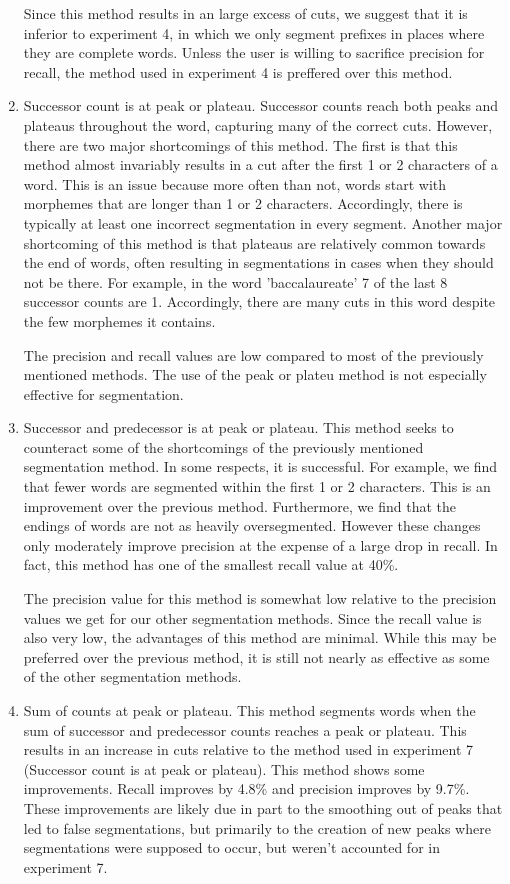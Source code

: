 \documentclass[11pt,letterpaper]{article}
\begin{document}
\begin{enumerate}
Since this method results in an large excess of cuts, we suggest that it is inferior to experiment 4, in which we only segment prefixes in places where they are complete words. Unless the user is willing to sacrifice precision for recall, the method used in experiment 4 is preffered over this method. 

\item Successor count is at peak or plateau. Successor counts reach both peaks and plateaus throughout the word, capturing many of the correct cuts. However, there are two major shortcomings of this method. The first is that this method almost invariably results in a cut after the first 1 or 2 characters of a word. This is an issue because more often than not, words start with morphemes that are longer than 1 or 2 characters. Accordingly, there is typically at least one incorrect segmentation in every segment. Another major shortcoming of this method is that plateaus are relatively common towards the end of words, often resulting in segmentations in cases when they should not be there. For example, in the word 'baccalaureate' 7 of the last 8 successor counts are 1. Accordingly, there are many cuts in this word despite the few morphemes it contains.

The precision and recall values are low compared to most of the previously mentioned methods. The use of the peak or plateu method is not especially effective for segmentation.

\item Successor and predecessor is at peak or plateau. This method seeks to counteract some of the shortcomings of the previously mentioned segmentation method. In some respects, it is successful. For example, we find that fewer words are segmented within the first 1 or 2 characters. This is an improvement over the previous method. Furthermore, we find that the endings of words are not as heavily oversegmented. However these changes only moderately improve precision at the expense of a large drop in recall. In fact, this method has one of the smallest recall value at 40\%.

The precision value for this method is somewhat low relative to the precision values we get for our other segmentation methods. Since the recall value is also very low, the advantages of this method are minimal. While this may be preferred over the previous method, it is still not nearly as effective as some of the other segmentation methods.

\item Sum of counts at peak or plateau. This method segments words when the sum of successor and predecessor counts reaches a peak or plateau. This results in an increase in cuts relative to the method used in experiment 7 (Successor count is at peak or plateau). This method shows some improvements. Recall improves by 4.8\% and precision improves by 9.7\%. These improvements are likely due in part to the smoothing out of peaks that led to false segmentations, but primarily to the creation of new peaks where segmentations were supposed to occur, but weren't accounted for in experiment 7.


\end{enumerate}
\end{document}
